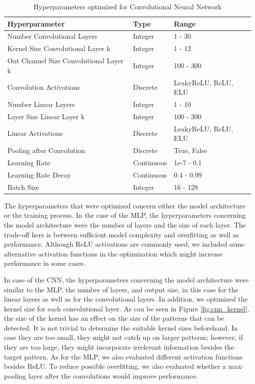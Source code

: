 \documentclass[runningheads]{llncs}
\begin{document}
\begin{table}[h]
    \vspace{0.1cm}
    \centering
    \setlength{\tabcolsep}{0.5em}
    \def\arraystretch{1.1}
    \begin{tabular}{L{4cm} | L{1.7cm} | L{2.5cm} }
    \hline
    \textbf{Hyperparameter}  & \textbf{Type} & \textbf{Range} \\
    \hline
    Number Convolutional Layers & Integer & 1 - 30 \\
    Kernel Size Convolutional Layer k & Integer & 1 - 12 \\
    Out Channel Size Convolutional Layer k & Integer & 100 - 300 \\
    Convolution Activations & Discrete & LeakyReLU, ReLU, ELU \\
    Number Linear Layers & Integer & 1 - 10 \\
    Layer Size Linear Layer k & Integer & 100 - 300 \\
    Linear Activations & Discrete & LeakyReLU, ReLU, ELU \\
    Pooling after Convolution & Discrete & True, False \\
    Learning Rate & Continuous & 1e-7 - 0.1 \\
    Learning Rate Decay & Continuous & 0.4 - 0.99 \\
    Batch Size & Integer & 16 - 128 \\
    \hline
   \end{tabular}
   \vspace{0.1cm}
   \caption{Hyperparameters optimized for Convolutional Neural Network}
   \label{tab:hyperparam-opt-cnn}
\end{table}


The hyperparameters that were optimized concern either the model architecture or the training process. In the case of the MLP, the hyperparameters concerning the model architecture were the number of layers and the size of each layer. The trade-off here is between sufficient model complexity and overfitting as well as performance. 
Although ReLU activations are commonly used, we included some alternative activation functions in the optimization which might increase performance in some cases.

In case of the CNN, the hyperparameters concerning the model architecture were similar to the MLP, the number of layers, and output size, in this case for the linear layers as well as for the convolutional layers. In addition, we optimized the kernel size for each convolutional layer. As can be seen in Figure \ref{fig:cnn_kernel}, the size of the kernel has an effect on the size of the patterns that can be detected. It is not trivial to determine the suitable kernel sizes beforehand. In case they are too small, they might not catch up on larger patterns; however, if they are too large, they might incorporate irrelevant information besides the target pattern. As for the MLP, we also evaluated different activation functions besides ReLU. To reduce possible overfitting, we also evaluated whether a max-pooling layer after the convolutions would improve performance. 
\end{document}
